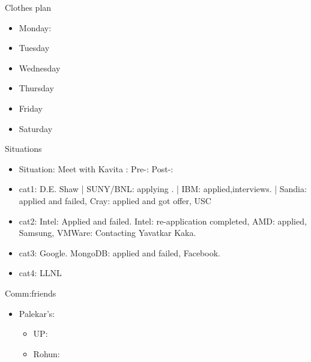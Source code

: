 \documentclass[serif, mathserif, final]{beamer}
\begin{document}
\begin{frame}
\begin{columns}
\begin{column}{0.25\linewidth}
  \begin{block}{Clothes plan} 
    \begin{itemize}
      \tiny \item \tiny Monday: 
    \item \tiny Tuesday
    \item \tiny Wednesday
    \item \tiny Thursday
    \item \tiny Friday
    \item \tiny Saturday
    \end{itemize} 
  \end{block}

      \begin{block}{Situations}
        \begin{itemize}


        \item \tiny Situation: Meet with Kavita : Pre-: Post-: 

        \end{itemize} 
      \end{block} 



\begin{block}
\begin{itemize}
\tiny \item \tiny cat1: 
D.E. Shaw | SUNY/BNL: applying . | IBM: applied,interviews.  | Sandia:
applied and failed, Cray: applied and got offer, USC
\item \tiny cat2:
     Intel: Applied and failed. Intel: re-application completed, AMD:
     applied, Samsung, VMWare: Contacting Yavatkar Kaka. 
\item \tiny cat3:
Google. MongoDB: applied and failed, Facebook. 
\item \tiny cat4: LLNL 
\end{itemize} 
\end{block} 


\begin{block}{Comm:friends} 
\begin{itemize} 
\item Palekar’s:  
\begin{itemize}
\item UP: 
\item Rohun: 
\end{itemize} 


\end{itemize}
\end{block}
\end{column}
\end{columns}
\end{frame}
\end{document}
